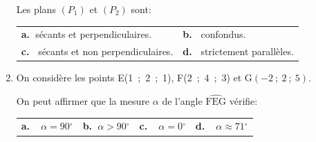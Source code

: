 \documentclass[10pt]{article}
\providecommand{\degres}{\ensuremath{^\circ}}
\providecommand{\degres}{{^\circ}}
\begin{document}
\begin{enumerate}[resume]
Les plans $\left(P_1\right)$ et $\left(P_2\right)$ sont:
\begin{center}
\begin{tabularx}{\linewidth}{X X}
\textbf{a.~}sécants et perpendiculaires.&\textbf{b.~} confondus.\\
\textbf{c.~} sécants et non perpendiculaires.& \textbf{d.~} strictement parallèles.
\end{tabularx}
\end{center}

\item On considère les points E(1~;~2~;~1), F(2~;~4~;~3) et G$(-2~;~ 2~;~5)$.

On peut affirmer que la mesure $\alpha$ de l'angle $\widehat{\text{FEG}}$ vérifie:
\begin{center}
\begin{tabularx}{\linewidth}{X X X X}
\textbf{a.~~}$\alpha = 90\degres$&\textbf{b.~\phantom{-}}$\alpha > 90\degres$
 &\textbf{c.~~}$\alpha = 0\degres$&\textbf{d.~~}$\alpha \approx  71\degres$
\end{tabularx}
\end{center}
\end{enumerate}

\bigskip
\end{document}
